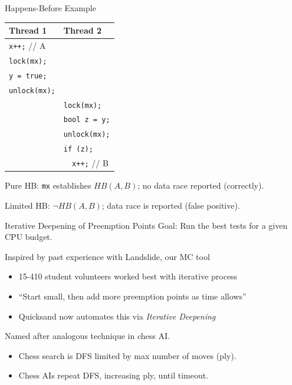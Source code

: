 \documentclass[xcolor=dvipsnames]{beamer}
\begin{document}
\begin{frame}{Happens-Before Example}
	\begin{center}
		\begin{tabular}{|l|l|}
			\hline
			\cellcolor{thread1} {\bf Thread 1} & \cellcolor{thread2} {\bf Thread 2} \\
			\hline
			\small \texttt{x++;} // A & \\
			\small \texttt{lock(mx);} & \\
			\small \texttt{y = true;} & \\
			\small \texttt{unlock(mx);} & \\
			
			& \small \texttt{lock(mx);} \\
			& \small \texttt{bool z = y;} \\
			& \small \texttt{unlock(mx);} \\
			& \small \texttt{if (z);} \\
			& \small \texttt{~~x++;} // B \\
			\hline
		\end{tabular}
	\end{center}
	Pure HB: \texttt{mx} establishes $HB(A, B)$; no data race reported (correctly).
	\linegap

	Limited HB: $\neg HB(A, B)$; data race is reported (false positive).
\end{frame}



\begin{frame}{Iterative Deepening of Preemption Points}
	Goal: Run the best tests for a given CPU budget.
	\linegap

	Inspired by past experience with Landslide, our MC tool
	\begin{itemize}
		\item 15-410 student volunteers worked best with iterative process
		\item ``Start small, then add more preemption points as time allows''
		\item Quicksand now automates this via {\em Iterative Deepening}
	\end{itemize}
	\linegap

	Named after analogous technique in chess AI.
	\begin{itemize}
		\item Chess search is DFS limited by max number of moves (ply).
		\item Chess AIs repeat DFS, increasing ply, until timeout.
	\end{itemize}
\end{frame}
\end{document}
